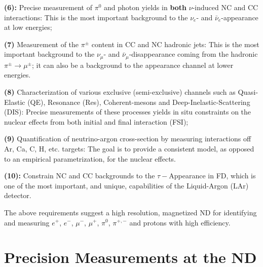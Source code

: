 \vspace{0.25cm} 
\noindent
{\bf (6):} Precise measurement 
of $\pi^0$ and photon yields  in {\bf both}  $\nu$-induced 
NC and CC interactions: 
This is the most important background to the $\nu_e$- and $\bar \nu_e$-appearance 
%
%
at low energies; 


\vspace{0.25cm} 
\noindent
{\bf (7)} Measurement of the $\pi^{\pm}$ content in 
CC and NC hadronic jets:  This is the most important background to 
the $\nu_\mu$- and $\bar \nu_\mu$-disappearance coming from  the hadronic   $\pi^{\pm} \rightarrow \mu^{\pm}$; 
it can also be a background to the 
%
%
appearance channel at lower energies. 

\vspace{0.25cm} 
\noindent
{\bf (8)} Characterization of various exclusive (semi-exclusive) 
channels such as Quasi-Elastic (QE), Resonance (Res), 
Coherent-mesons and Deep-Inelastic-Scattering (DIS): 
Precise measurements of these processes yields  
 in situ constraints on the nuclear effects from both initial and final interaction (FSI); 

\vspace{0.25cm} 
\noindent 
{\bf (9)} Quantification of neutrino-argon cross-section 
by measuring interactions off Ar, Ca, C, H, etc. targets: The goal is to provide 
a consistent model, as opposed to an empirical parametrization, for the nuclear effects. 


\vspace{0.25cm} 
\noindent 
{\bf (10):} Constrain NC and CC backgrounds to the {\boldmath $\tau-$}Appearance in FD, 
which is one of the most important, and unique, capabilities of the Liquid-Argon (LAr) detector. 

\noindent
The above requirements suggest a high resolution, magnetized ND for identifying and 
measuring $e^+$, $e^-$, $\mu^-$, $\mu^+$, $\pi^0$, $\pi^{+,-}$ and protons  with high efficiency. 



\section{Precision Measurements at the ND} 
\label{sec-nd-sbp} 

